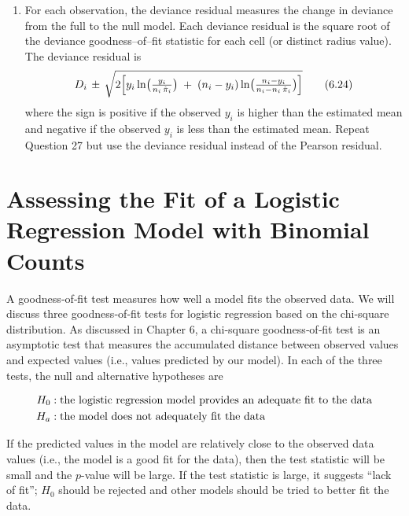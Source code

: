 \documentclass[
]{report}
\providecommand{\tightlist}{%
  \setlength{\itemsep}{0pt}\setlength{\parskip}{0pt}}
\begin{document}
\begin{enumerate}
\def\labelenumi{\arabic{enumi}.}
\setcounter{enumi}{27}
\tightlist
\item
  For each observation, the deviance residual measures the change in deviance from the full to the null model. Each deviance residual is the square root of the deviance goodness--of--fit statistic for each cell (or distinct radius value). The deviance residual is
  \begin{align}
  D_i \,\pm\, \sqrt{2 \Bigl[
  y_i \ln\bigl(\tfrac{y_i}{n_i\,\hat\pi_i}\bigr)
  \;+\;(n_i - y_i)\ln\bigl(\tfrac{n_i - y_i}{n_i - n_i\,\hat\pi_i}\bigr)
  \Bigr]}
  \tag{6.24}
  \end{align}
  where the sign is positive if the observed \(y_i\) is higher than the estimated mean and negative if the
  observed \(y_i\) is less than the estimated mean. Repeat Question 27 but use the deviance residual instead
  of the Pearson residual.
\end{enumerate}

\hypertarget{assessing-the-fit-of-a-logistic-regression-model-with-binomial-counts}{%
\section{\texorpdfstring{\textbf{Assessing the Fit of a Logistic Regression Model with Binomial Counts}}{Assessing the Fit of a Logistic Regression Model with Binomial Counts}}\label{assessing-the-fit-of-a-logistic-regression-model-with-binomial-counts}}

A goodness‐of‐fit test measures how well a model fits the observed data. We will discuss three goodness‐of‐fit tests for logistic regression based on the chi‐square distribution. As discussed in Chapter 6, a chi‐square goodness‐of‐fit test is an asymptotic test that measures the accumulated distance between observed values and expected values (i.e., values predicted by our model). In each of the three tests, the null and alternative hypotheses are

\begin{align}
H_0:\;&\text{the logistic regression model provides an adequate fit to the data} \notag \\
H_a:\;&\text{the model does not adequately fit the data} \notag
\end{align}

If the predicted values in the model are relatively close to the observed data values (i.e., the model is a good fit for the data), then the test statistic will be small and the \(p\)-value will be large. If the test statistic is large, it suggests ``lack of fit''; \(H_0\) should be rejected and other models should be tried to better fit the data.
\end{document}
